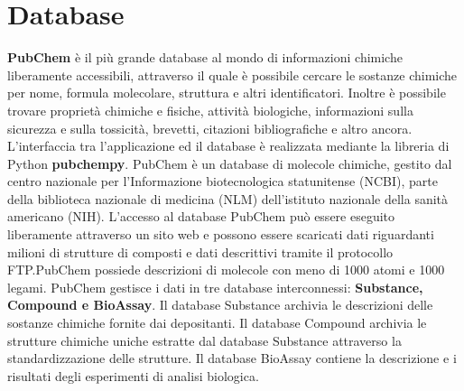 \section{Database}\label{sec:2.2}
\textbf{PubChem} è il più grande database al mondo di informazioni chimiche liberamente accessibili, attraverso il quale è possibile cercare le sostanze chimiche per nome, formula molecolare, struttura e altri identificatori. Inoltre è possibile trovare proprietà chimiche e fisiche, attività biologiche, informazioni sulla sicurezza e sulla tossicità, brevetti, citazioni bibliografiche e altro ancora. L'interfaccia tra l'applicazione ed il database è realizzata mediante la libreria di Python \textbf{pubchempy}.\newline
PubChem è un database di molecole chimiche, gestito dal centro nazionale per l'Informazione biotecnologica statunitense (NCBI), parte della biblioteca nazionale di medicina (NLM) dell'istituto nazionale della sanità americano (NIH). L'accesso al database PubChem può essere eseguito liberamente attraverso un sito web e possono essere scaricati dati riguardanti milioni di strutture di composti e dati descrittivi tramite il protocollo FTP.PubChem possiede descrizioni di molecole con meno di 1000 atomi e 1000 legami. \newline 
PubChem gestisce i dati in tre database interconnessi: \textbf{Substance, Compound e BioAssay}. Il database Substance archivia le descrizioni delle sostanze chimiche fornite dai depositanti. Il database Compound archivia le strutture chimiche uniche estratte dal database Substance attraverso la standardizzazione delle strutture. Il database BioAssay contiene la descrizione e i risultati degli esperimenti di analisi biologica.

